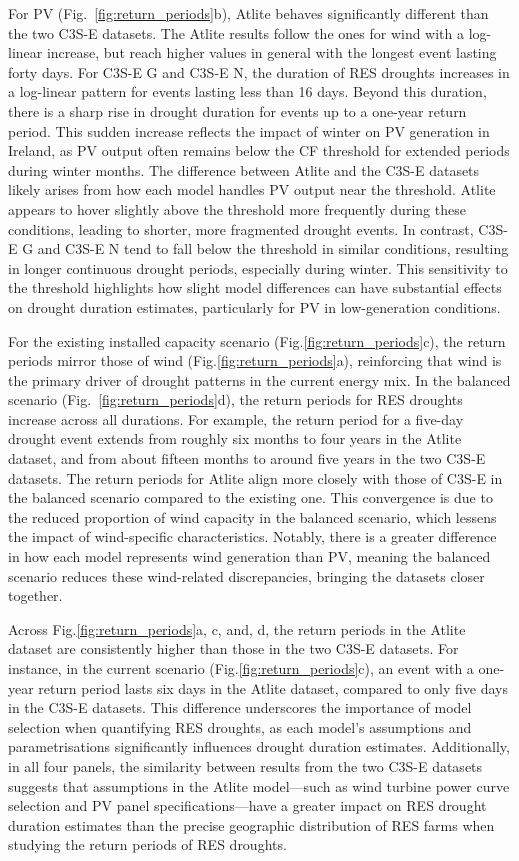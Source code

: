 \documentclass[a4paper, 11pt]{article}
\begin{document}
For PV (Fig.~\ref{fig:return_periods}b), Atlite behaves significantly different than the two C3S-E datasets. The Atlite results follow the ones for wind with a log-linear increase, but reach higher values in general with the longest event lasting forty days. For C3S-E G and C3S-E N, the duration of RES droughts increases in a log-linear pattern for events lasting less than 16 days. Beyond this duration, there is a sharp rise in drought duration for events up to a one-year return period. This sudden increase reflects the impact of winter on PV generation in Ireland, as PV output often remains below the CF threshold for extended periods during winter months. The difference between Atlite and the C3S-E datasets likely arises from how each model handles PV output near the threshold. Atlite appears to hover slightly above the threshold more frequently during these conditions, leading to shorter, more fragmented drought events. In contrast, C3S-E G and C3S-E N tend to fall below the threshold in similar conditions, resulting in longer continuous drought periods, especially during winter. This sensitivity to the threshold highlights how slight model differences can have substantial effects on drought duration estimates, particularly for PV in low-generation conditions.

For the existing installed capacity scenario (Fig.\ref{fig:return_periods}c), the return periods mirror those of wind (Fig.\ref{fig:return_periods}a), reinforcing that wind is the primary driver of drought patterns in the current energy mix. In the balanced scenario (Fig.~\ref{fig:return_periods}d), the return periods for RES droughts increase across all durations. For example, the return period for a five-day drought event extends from roughly six months to four years in the Atlite dataset, and from about fifteen months to around five years in the two C3S-E datasets. The return periods for Atlite align more closely with those of C3S-E in the balanced scenario compared to the existing one. This convergence is due to the reduced proportion of wind capacity in the balanced scenario, which lessens the impact of wind-specific characteristics. Notably, there is a greater difference in how each model represents wind generation than PV, meaning the balanced scenario reduces these wind-related discrepancies, bringing the datasets closer together.
 
Across Fig.\ref{fig:return_periods}a, c, and, d, the return periods in the Atlite dataset are consistently higher than those in the two C3S-E datasets. For instance, in the current scenario (Fig.\ref{fig:return_periods}c), an event with a one-year return period lasts six days in the Atlite dataset, compared to only five days in the C3S-E datasets. This difference underscores the importance of model selection when quantifying RES droughts, as each model’s assumptions and parametrisations significantly influences drought duration estimates. Additionally, in all four panels, the similarity between results from the two C3S-E datasets suggests that assumptions in the Atlite model—such as wind turbine power curve selection and PV panel specifications—have a greater impact on RES drought duration estimates than the precise geographic distribution of RES farms when studying the return periods of RES droughts.
\end{document}
